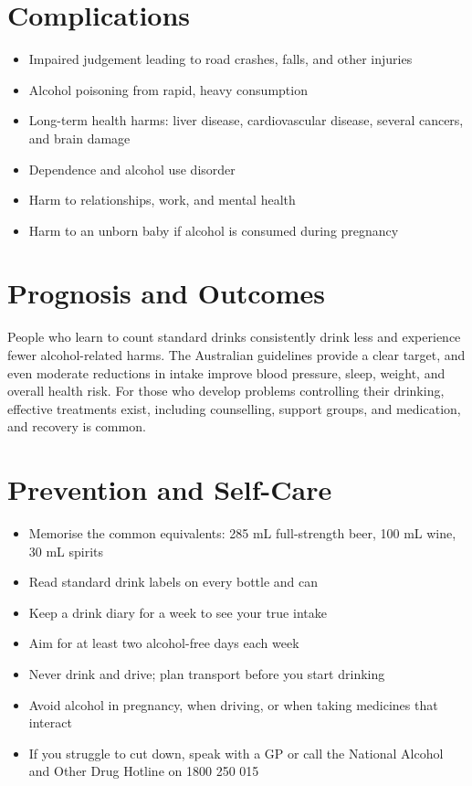 \section*{Complications}
\begin{itemize}
    \item Impaired judgement leading to road crashes, falls, and other injuries
    \item Alcohol poisoning from rapid, heavy consumption
    \item Long-term health harms: liver disease, cardiovascular disease, several cancers, and brain damage
    \item Dependence and alcohol use disorder
    \item Harm to relationships, work, and mental health
    \item Harm to an unborn baby if alcohol is consumed during pregnancy
\end{itemize}

\section*{Prognosis and Outcomes}
People who learn to count standard drinks consistently drink less and experience fewer alcohol-related harms. The Australian guidelines provide a clear target, and even moderate reductions in intake improve blood pressure, sleep, weight, and overall health risk. For those who develop problems controlling their drinking, effective treatments exist, including counselling, support groups, and medication, and recovery is common.

\section*{Prevention and Self-Care}
\begin{itemize}
    \item Memorise the common equivalents: 285 mL full-strength beer, 100 mL wine, 30 mL spirits
    \item Read standard drink labels on every bottle and can
    \item Keep a drink diary for a week to see your true intake
    \item Aim for at least two alcohol-free days each week
    \item Never drink and drive; plan transport before you start drinking
    \item Avoid alcohol in pregnancy, when driving, or when taking medicines that interact
    \item If you struggle to cut down, speak with a GP or call the National Alcohol and Other Drug Hotline on 1800 250 015
\end{itemize}


